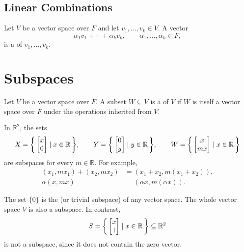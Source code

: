 \subsection{Linear Combinations}

\begin{Definition}
Let $V$ be a vector space over $F$ and let $v_1,\ldots,v_k\in V$. A vector
\begin{equation*}
\alpha_1v_1+\cdots+\alpha_kv_k,
\qquad \alpha_1,\ldots,\alpha_k\in F,
\end{equation*}
is a  of $v_1,\ldots,v_k$.
\end{Definition}

\section{Subspaces}\label{sec:Subspaces}

\begin{Definition}
Let $V$ be a vector space over $F$. A subset $W\subseteq V$ is a  of $V$ if $W$ is itself a vector space over $F$ under the operations inherited from $V$.
\end{Definition}

\begin{Example}
In $\mathbb R^2$, the sets
\begin{equation*}
X=\qty{\, \begin{bmatrix}x\\0\end{bmatrix} \mid x\in\mathbb R \,},\qquad
Y=\qty{\, \begin{bmatrix}0\\y\end{bmatrix} \mid y\in\mathbb R \,},\qquad
W=\qty{\, \begin{bmatrix}x\\mx\end{bmatrix} \mid x\in\mathbb R \,}
\end{equation*}
are subspaces for every $m\in\mathbb R$. For example,
\begin{align*}
(x_1,mx_1)+(x_2,mx_2)&=(x_1+x_2,m(x_1+x_2)),\\
\alpha(x,mx)&=(\alpha x,m(\alpha x)).
\end{align*}
\end{Example}

The set $\{0\}$ is the  (or trivial subspace) of any vector space. The whole vector space $V$ is also a subspace. In contrast,
\begin{equation*}
S=\qty{\, \begin{bmatrix}x\\1\end{bmatrix} \mid x\in\mathbb R \,}\subseteq\mathbb R^2
\end{equation*}
is not a subspace, since it does not contain the zero vector.

